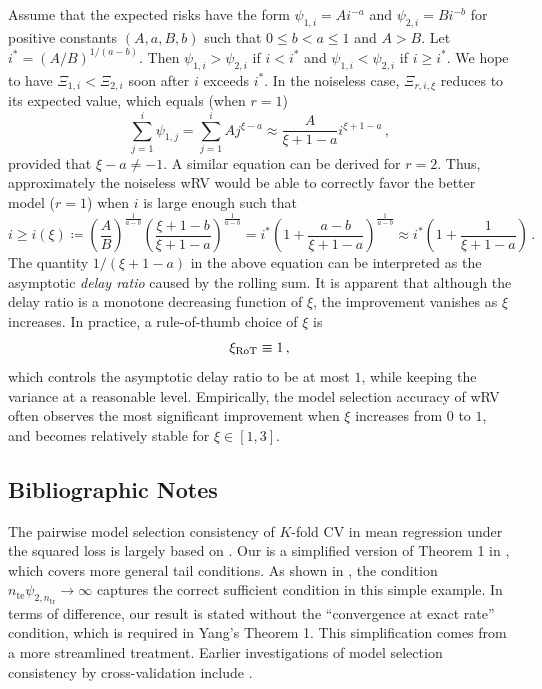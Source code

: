 \documentclass[11pt]{article}
\theoremstyle{plain}
\newcommand{\tr}{{\mathrm{tr}}}
\newcommand{\te}{{\mathrm{te}}}
\begin{document}
Assume that  the expected risks have the form $\psi_{1,i}=A i^{-a}$ and $\psi_{2,i}=B i^{-b}$ for positive constants $(A,a,B,b)$ such that $0\le b <a\le 1$ and $A>B$.   Let $i^*=(A/B)^{1/(a-b)}$. Then $\psi_{1,i}>\psi_{2,i}$ if $i<i^*$ and $\psi_{1,i}<\psi_{2,i}$ if $i\ge i^*$.   We hope to have $\Xi_{1,i}<\Xi_{2,i}$ soon after $i$ exceeds $i^*$.  In the noiseless case, $\Xi_{r,i,\xi}$ reduces to its expected value, which equals (when $r=1$)
$$\sum_{j=1}^i\psi_{1,j} =\sum_{j=1}^i A j^{\xi-a}\approx  \frac{A}{\xi+1-a}i^{\xi+1-a}\,,$$
provided that $\xi-a\neq -1$.
A similar equation can be derived for $r=2$. Thus, approximately the noiseless wRV would be able to correctly favor the better model ($r=1$) when $i$ is large enough such that
$$
i\ge i(\xi)\coloneqq\left(\frac{A}{B}\right)^{\frac{1}{a-b}}\left(\frac{\xi+1-b}{\xi+1-a}\right)^{\frac{1}{a-b}} = i^* \left(1+\frac{a-b}{\xi+1-a}\right)^{\frac{1}{a-b}}\approx i^*\left(1+\frac{1}{\xi+1-a}\right)\,.
$$
The quantity $1/(\xi+1-a)$ in the above equation can be interpreted as the asymptotic \emph{delay ratio} caused by the rolling sum.  It is apparent that although the delay ratio is a monotone decreasing function of $\xi$, the improvement vanishes as $\xi$ increases.  In practice, a rule-of-thumb choice of $\xi$ is
$$\xi_{\rm RoT}\equiv 1\,,$$
which controls the asymptotic delay ratio to be at most $1$, while keeping the variance at a reasonable level.  Empirically, the model selection accuracy of wRV often observes the most significant improvement when $\xi$ increases from $0$ to $1$, and becomes relatively stable for $\xi\in[1,3]$.


\subsection{Bibliographic Notes}\label{subsec:3.5-wrv-increase-M-bibliography}
The pairwise model selection consistency of $K$-fold CV in mean regression under the squared loss is largely based on \cite{yang2007consistency}.  Our  is a simplified version of Theorem 1 in \cite{yang2007consistency}, which covers more general tail conditions.  As shown in , the condition $n_{\te}\psi_{2,n_\tr}\rightarrow\infty$ captures the correct sufficient condition in this simple example.  In terms of difference, our result is stated without the ``convergence at exact rate'' condition, which is required in Yang's Theorem 1. This simplification comes from a more streamlined treatment.  Earlier investigations of model selection consistency by cross-validation include \cite{Zhang93,Shao93}.
\end{document}
